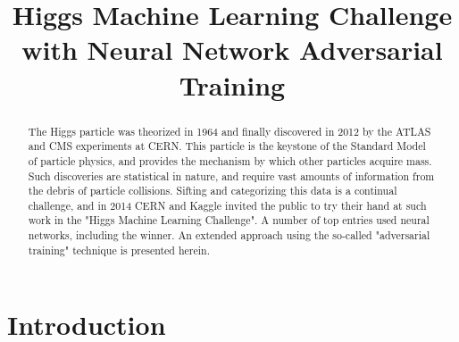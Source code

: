 \documentclass          {article} %
\title                  {Higgs Machine Learning Challenge \\with Neural Network Adversarial Training}
\begin{document}
\maketitle


\begin                  {abstract}
The Higgs particle was theorized in 1964 and finally discovered in 2012 by the ATLAS and CMS experiments at CERN. This particle is the keystone of the Standard Model of particle physics, and provides the mechanism by which other particles acquire mass. Such discoveries are statistical in nature, and require vast amounts of information from the debris of particle collisions. Sifting and categorizing this data is a continual challenge, and in 2014 CERN and Kaggle invited the public to try their hand at such work in the "Higgs Machine Learning Challenge". A number of top entries used neural networks, including the winner. An extended approach using the so-called "adversarial training" technique is presented herein.
\end                    {abstract}


               \section {Introduction}
               \label   {sec:introduction}

\end{document}
